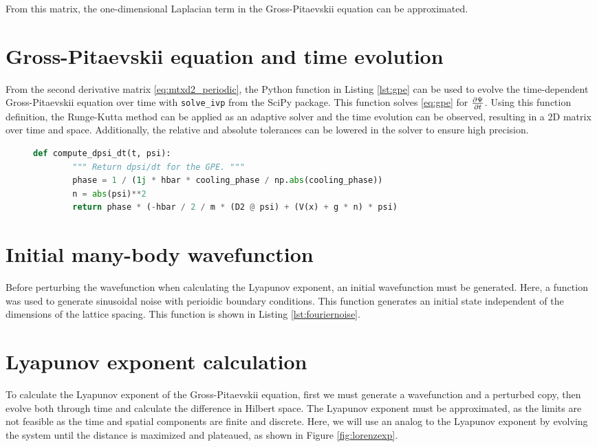 	From this matrix, the one-dimensional Laplacian term in the Gross-Pitaevskii equation can be approximated.
	
	\section{Gross-Pitaevskii equation and time evolution}
	From the second derivative matrix \eqref{eq:mtxd2_periodic}, the Python function in Listing \ref{lst:gpe} can be used to evolve the time-dependent Gross-Pitaevskii equation over time with \texttt{solve\_ivp} from the SciPy package. This function solves \eqref{eq:gpe} for $\pdv{\Psi}{t}$. Using this function definition, the Runge-Kutta method can be applied as an adaptive solver and the time evolution can be observed, resulting in a 2D matrix over time and space. Additionally, the relative and absolute tolerances can be lowered in the solver to ensure high precision.

	\begin{figure}[h]
		\begin{lstlisting}[language=Python, caption={The \texttt{solve\_ivp} wrapper function for the Gross-Pitaevskii equation. This function approximates \eqref{eq:gpe}.}, label={lst:gpe}]
	def compute_dpsi_dt(t, psi):
		""" Return dpsi/dt for the GPE. """
		phase = 1 / (1j * hbar * cooling_phase / np.abs(cooling_phase))
		n = abs(psi)**2
		return phase * (-hbar / 2 / m * (D2 @ psi) + (V(x) + g * n) * psi)
		\end{lstlisting}
	\end{figure}

	\section{Initial many-body wavefunction}
	Before perturbing the wavefunction when calculating the Lyapunov exponent, an initial wavefunction must be generated. Here, a function was used to generate sinusoidal noise with perioidic boundary conditions. This function generates an initial state independent of the dimensions of the lattice spacing. This function is shown in Listing \ref{lst:fouriernoise}.

	\section{Lyapunov exponent calculation}
	To calculate the Lyapunov exponent of the Gross-Pitaevskii equation, first we must generate a wavefunction and a perturbed copy, then evolve both through time and calculate the difference in Hilbert space. The Lyapunov exponent must be approximated, as the limits are not feasible as the time and spatial components are finite and discrete. Here, we will use an analog to the Lyapunov exponent by evolving the system until the distance is maximized and plateaued, as shown in Figure \ref{fig:lorenzexp}.
	
